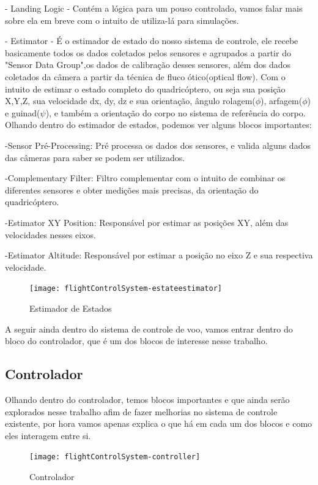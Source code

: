- Landing Logic - Contém a lógica para um pouso controlado, vamos falar mais sobre ela em breve com o intuito de utiliza-lá para simulações. 

- Estimator - É o estimador de estado do nosso sistema de controle, ele recebe basicamente todos os dados coletados pelos sensores e agrupados a partir do "Sensor Data Group",os dados de calibração desses sensores, além dos dados coletados da câmera a partir da técnica de fluco ótico(optical flow). Com o intuito de estimar o estado completo do quadricóptero, ou seja sua posição X,Y,Z, sua velocidade dx, dy, dz e sua orientação, ângulo rolagem($\phi$), arfagem($\phi$) e guinad($\psi$), e também a orientação do corpo no sistema de referência do corpo.
Olhando dentro do estimador de estados, podemos ver alguns blocos importantes:

-Sensor Pré-Processing: Pré processa os dados dos sensores, e valida alguns dados das câmeras para saber se podem ser utilizados.

-Complementary Filter: Filtro complementar com o intuito de combinar os diferentes sensores e obter medições mais precisas, da orientação do quadricóptero.

-Estimator XY Position: Responsável por estimar as posições XY, além das velocidades nesses eixos. 

-Estimator Altitude: Responsável por estimar a posição no eixo Z e sua respectiva velocidade.

\begin{figure}[H]
	\centering
	\texttt{[image: flightControlSystem-estateestimator]}
	\caption{Estimador de Estados}
	\centering
	\label{Estimador de Estados}
\end{figure}

A seguir ainda dentro do sistema de controle de voo, vamos entrar dentro do bloco do controlador, que é um dos blocos de interesse nesse trabalho.

\subsection{Controlador}

Olhando dentro do controlador, temos blocos importantes e que ainda serão explorados nesse trabalho afim de fazer melhorias no sistema de controle existente, por hora vamos apenas explica o que há em cada um dos blocos e como eles interagem entre si. 


\begin{figure}[H]
	\centering
	\texttt{[image: flightControlSystem-controller]}
	\caption{Controlador}
	\centering
	\label{Controlador}
\end{figure}


